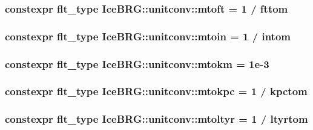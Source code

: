 \subsubsection[{mtoft}]{\setlength{\rightskip}{0pt plus 5cm}constexpr {\bf flt\+\_\+type} Ice\+B\+R\+G\+::unitconv\+::mtoft = 1 / {\bf fttom}}\label{namespaceIceBRG_1_1unitconv_aaf08afc8ae31133c13dbdc80e88f5c44}
\hypertarget{namespaceIceBRG_1_1unitconv_a1fbce783451e4e0cf333d50a5f5dfbe6}{}
\subsubsection[{mtoin}]{\setlength{\rightskip}{0pt plus 5cm}constexpr {\bf flt\+\_\+type} Ice\+B\+R\+G\+::unitconv\+::mtoin = 1 / {\bf intom}}\label{namespaceIceBRG_1_1unitconv_a1fbce783451e4e0cf333d50a5f5dfbe6}
\hypertarget{namespaceIceBRG_1_1unitconv_add2770e80de2de4046af14a99434f71d}{}
\subsubsection[{mtokm}]{\setlength{\rightskip}{0pt plus 5cm}constexpr {\bf flt\+\_\+type} Ice\+B\+R\+G\+::unitconv\+::mtokm = 1e-\/3}\label{namespaceIceBRG_1_1unitconv_add2770e80de2de4046af14a99434f71d}
\hypertarget{namespaceIceBRG_1_1unitconv_ab591dc07343d9e0b89940a64584309e9}{}
\subsubsection[{mtokpc}]{\setlength{\rightskip}{0pt plus 5cm}constexpr {\bf flt\+\_\+type} Ice\+B\+R\+G\+::unitconv\+::mtokpc = 1 / {\bf kpctom}}\label{namespaceIceBRG_1_1unitconv_ab591dc07343d9e0b89940a64584309e9}
\hypertarget{namespaceIceBRG_1_1unitconv_a1e7662b670d56d1a7aba14b48384d525}{}
\subsubsection[{mtoltyr}]{\setlength{\rightskip}{0pt plus 5cm}constexpr {\bf flt\+\_\+type} Ice\+B\+R\+G\+::unitconv\+::mtoltyr = 1 / {\bf ltyrtom}}\label{namespaceIceBRG_1_1unitconv_a1e7662b670d56d1a7aba14b48384d525}
\hypertarget{namespaceIceBRG_1_1unitconv_a74daefd07edcb727cfb81bcbee32fda6}{}
